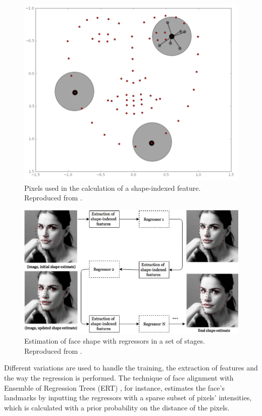 \begin{figure}[h]
    \centering
    \includegraphics[width=0.6\linewidth]{Content/figures/shape-indexed.png}
    \caption{Pixels used in the calculation of a shape-indexed feature. Reproduced from \textcite{maris2015}.}
    \label{fig:shape-indexed}
\end{figure}

\begin{figure}[h]
    \centering
    \includegraphics[width=1.0\linewidth]{Content/figures/cascade-explanation.png}
    \caption{Estimation of face shape with regressors in a set of stages. Reproduced from \textcite{maris2015}.}
    \label{fig:regressor-steps}
\end{figure}

Different variations are used to handle the training, the extraction of features and the way the regression is performed. The technique of face alignment with Ensemble of Regression Trees (ERT) \parencite{kazemi2014one}, for instance, estimates the face's landmarks by inputting the regressors with a sparse subset of pixels' intensities, which is calculated with a prior probability on the distance of the pixels.

